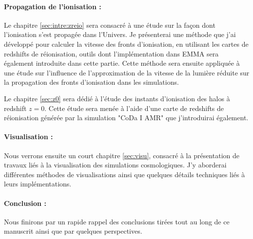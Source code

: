 \paragraph{Propagation de l'ionisation :}
Le chapitre \ref{sec:intre:zreio} sera consacré à une étude sur la façon dont l'ionisation s'est propagée dans l'Univers.
Je présenterai une méthode que j'ai développé pour calculer la vitesse des fronts d'ionisation, en utilisant les cartes de redshifts de réionisation, outils dont l'implémentation dans EMMA sera également introduite dans cette partie.
Cette méthode sera ensuite appliquée à une étude sur l'influence de l'approximation de la vitesse de la lumière réduite sur la propagation des fronts d'ionisation dans les simulations.

Le chapitre \ref{sec:z0} sera dédié à l'étude des instants d'ionisation des halos à redshift $z=0$.
Cette étude sera menée à l'aide d'une carte de redshifts de réionisation générée par la simulation "CoDa I AMR" que j'introduirai également.

\paragraph{Visualisation : }
Nous verrons ensuite un court chapitre  \ref{sec:visu}, consacré à la présentation de travaux liés à la visualisation des simulations cosmologiques.
J'y aborderai différentes méthodes de visualisations ainsi que quelques détails techniques liés à leurs implémentations.

\paragraph{Conclusion :}
Nous finirons par un rapide rappel des conclusions tirées tout au long de ce manuscrit ainsi que par quelques perspectives.

